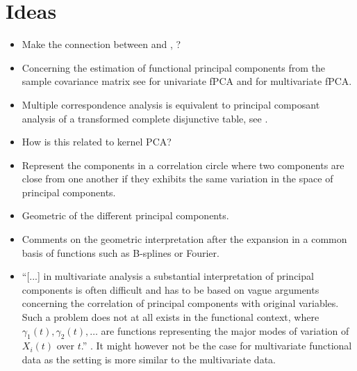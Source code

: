 \section{Ideas} %
\label{sec:ideas}

\begin{itemize}
    \item Make the connection between \cite{happMultivariateFunctionalPrincipal2018a} and \cite{berrenderoPrincipalComponentsMultivariate2011}, \cite{yangFunctionalSingularComponent2011}?
    \item Concerning the estimation of functional principal components from the sample covariance matrix see \cite[Chap. 8.4]{ramsayFunctionalDataAnalysis2005} for univariate fPCA and \cite{happMultivariateFunctionalPrincipal2018a} for multivariate fPCA.
    \item Multiple correspondence analysis is equivalent to principal composant analysis of a transformed complete disjunctive table, see \cite{pagesMultipleFactorAnalysis2014}.
    \item How is this related to kernel PCA?
    \item Represent the components in a correlation circle where two components are close from one another if they exhibits the same variation in the space of principal components.
    \item Geometric of the different principal components.
    \item Comments on the geometric interpretation after the expansion in a common basis of functions such as B-splines or Fourier.
    \item ``[...] in multivariate analysis a substantial interpretation of principal components is often difficult and has to be based on vague arguments concerning the correlation of principal components with original variables. Such a problem does not at all exists in the functional context, where $\gamma_1(t), \gamma_2(t), \dots$ are functions representing the major modes of variation of $X_i(t)$ over $t$.'' \cite{benkoCommonFunctionalPrincipal2009}. It might however not be the case for multivariate functional data as the setting is more similar to the multivariate data.
\end{itemize}

